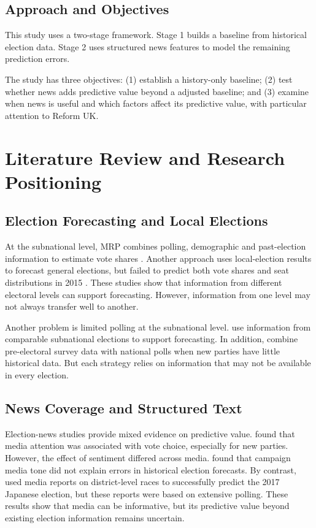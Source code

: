 \documentclass[final-report]{report-template}
\begin{document}
\subsection{Approach and Objectives}

This study uses a two-stage framework. Stage 1 builds a baseline from historical election data. Stage 2 uses structured news features to model the remaining prediction errors.

The study has three objectives: (1) establish a history-only baseline; (2) test whether news adds predictive value beyond a adjusted baseline; and (3) examine when news is useful and which factors affect its predictive value, with particular attention to Reform UK.

\section{Literature Review and Research Positioning}
\subsection{Election Forecasting and Local Elections}

At the subnational level, MRP combines polling, demographic and past-election information to estimate vote shares \parencite{LAUDERDALE2020399}. Another approach uses local-election results to forecast general elections, but failed to predict both vote shares and seat distributions in 2015 \parencite{RALLINGS2016}. These studies show that information from different electoral levels can support forecasting. However, information from one level may not always transfer well to another.

Another problem is limited polling at the subnational level. \textcite{STOETZER2025102939} use information from comparable subnational elections to support forecasting. In addition, \textcite{MONTALVO201952} combine pre-electoral survey data with national polls when new parties have little historical data. But each strategy relies on information that may not be available in every election.

\subsection{News Coverage and Structured Text}

Election-news studies provide mixed evidence on predictive value. \textcite{VERMEER2024} found that media attention was associated with vote choice, especially for new parties. However, the effect of sentiment differed across media. \textcite{BELANGER2012702} found that campaign media tone did not explain errors in historical election forecasts. By contrast, \textcite{UMEDA2023956} used media reports on district-level races to successfully predict the 2017 Japanese election, but these reports were based on extensive polling. These results show that media can be informative, but its predictive value beyond existing election information remains uncertain.
\end{document}
